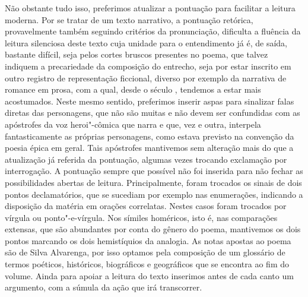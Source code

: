 Não obstante tudo isso, preferimos atualizar a pontuação para facilitar a leitura moderna.
Por se tratar de um texto narrativo, a pontuação retórica, provavelmente também
seguindo critérios da pronunciação, dificulta a fluência da leitura silenciosa
deste texto cuja unidade para o entendimento já é, de saída, bastante difícil, seja pelos cortes bruscos presentes no poema, que talvez indiquem a precariedade da composição do entrecho, 
seja por estar inscrito em outro registro de representação ficcional, diverso por exemplo
da narrativa de romance em prosa, com a qual, desde o século , tendemos a estar mais
acostumados.
Neste mesmo sentido, preferimos inserir aspas para sinalizar falas diretas das personagens,
que não são muitas e não devem ser confundidas com as apóstrofes da voz heroi"-cômica que
narra e que, vez e outra, interpela fantasticamente as próprias personagens, como estava
previsto na convenção da poesia épica em geral.
Tais apóstrofes mantivemos sem alteração mais do que a atualização já referida da
pontuação, algumas vezes trocando exclamação por interrogação.
A pontuação sempre que possível não foi inserida para não fechar as possibilidades
abertas de leitura. Principalmente, foram trocados os sinais de dois pontos declamatórios,
que se sucediam por exemplo nas enumerações, indicando a disposição da matéria em orações
correlatas. Nestes casos foram trocados por vírgula ou ponto"-e-vírgula. Nos símiles homéricos,
isto é, nas comparações extensas, que são abundantes por conta do gênero do poema,
mantivemos os dois pontos marcando os dois hemistíquios da analogia. As notas apostas ao poema são de Silva Alvarenga, por isso optamos pela composição de um glossário de termos poéticos, históricos, biográficos e geográficos que se encontra ao fim do volume. Ainda para apoiar a leitura do texto inserimos antes de cada canto um argumento, com a súmula da ação que irá transcorrer.


\pagebreak

